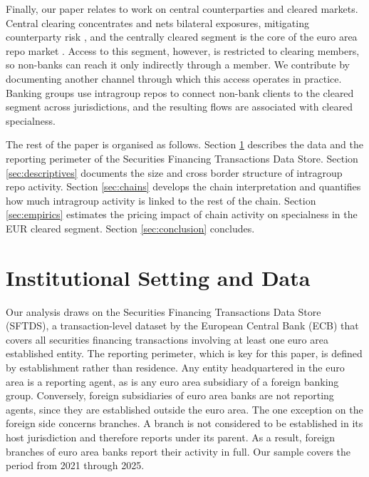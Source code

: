 \documentclass[english, 11pt, oneside, legal]{article}
\begin{document}
Finally, our paper relates to work on central counterparties and cleared markets. Central clearing concentrates and nets bilateral exposures, mitigating counterparty risk \citep{duffiezhu2011, menkveld2021}, and the centrally cleared segment is the core of the euro area repo market \citep{mancini2016, boissel2017}. Access to this segment, however, is restricted to clearing members, so non-banks can reach it only indirectly through a member. We contribute by documenting another channel through which this access operates in practice. Banking groups use intragroup repos to connect non-bank clients to the cleared segment across jurisdictions, and the resulting flows are associated with cleared specialness.




The rest of the paper is organised as follows. Section \ref{sec:data} describes the data and the reporting perimeter of the Securities Financing Transactions Data Store. Section \ref{sec:descriptives} documents the size and cross border structure of intragroup repo activity. Section \ref{sec:chains} develops the chain interpretation and quantifies how much intragroup activity is linked to the rest of the chain. Section \ref{sec:empirics} estimates the pricing impact of chain activity on specialness in the EUR cleared segment. Section \ref{sec:conclusion} concludes.


\section{Institutional Setting and Data}
\label{sec:data}

Our analysis draws on the Securities Financing Transactions Data Store (SFTDS), a transaction-level dataset by the European Central Bank (ECB) that covers all securities financing transactions involving at least one euro area established entity. The reporting perimeter, which is key for this paper, is defined by establishment rather than residence. Any entity headquartered in the euro area is a reporting agent, as is any euro area subsidiary of a foreign banking group. Conversely, foreign subsidiaries of euro area banks are not reporting agents, since they are established outside the euro area. The one exception on the foreign side concerns branches. A branch is not considered to be established in its host jurisdiction and therefore reports under its parent. As a result, foreign branches of euro area banks report their activity in full. Our sample covers the period from 2021 through 2025.
\end{document}
